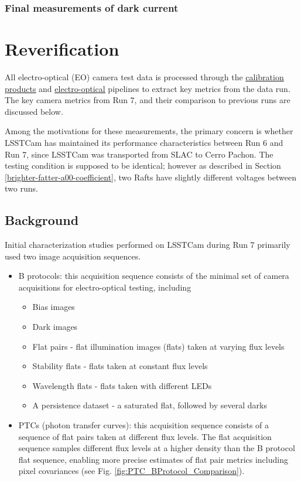 \subsubsection{Final measurements of dark
current}\label{final-measurements-of-dark-current}

\section{Reverification}\label{reverification}

All electro-optical (EO) camera test data is processed through the
\underline{\href{https://github.com/lsst/cp_pipe/tree/main}{calibration products}} and
\underline{\href{https://github.com/lsst-camera-dh/eo_pipe/tree/main}{electro-optical}}
pipelines to extract key metrics from the data run. The key camera
metrics from Run 7, and their comparison to previous runs are discussed
below.




Among the motivations for these measurements, the primary concern is whether LSSTCam has
maintained its performance characteristics between Run 6 and Run 7, since LSSTCam was transported from SLAC to Cerro Pachon.
The testing condition is supposed to be identical; however as described in Section \ref{brighter-fatter-a00-coefficient}, two Rafts have slightly different voltages between two runs.

\subsection{Background}\label{background}

Initial characterization studies performed on LSSTCam during Run 7 primarily used two
image acquisition sequences.

\begin{itemize}
\tightlist
\item
  B protocols: this acquisition sequence consists of the minimal set of
  camera acquisitions for electro-optical testing, including

  \begin{itemize}
  \tightlist
  \item
    Bias images
  \item
    Dark images
  \item
    Flat pairs - flat illumination images (flats) taken at varying flux levels
  \item
    Stability flats - flats taken at constant flux levels
  \item
    Wavelength flats - flats taken with different LEDs
  \item
    A persistence dataset - a saturated flat, followed by several darks
  \end{itemize}
\item
  PTCs (photon transfer curves): this acquisition sequence consists of a
  sequence of flat pairs taken at different flux levels. The flat
  acquisition sequence samples different flux levels at a higher density
  than the B protocol flat sequence, enabling more precise estimates of
  flat pair metrics including pixel covariances (see Fig. \ref{fig:PTC_BProtocol_Comparison}).
\end{itemize}

